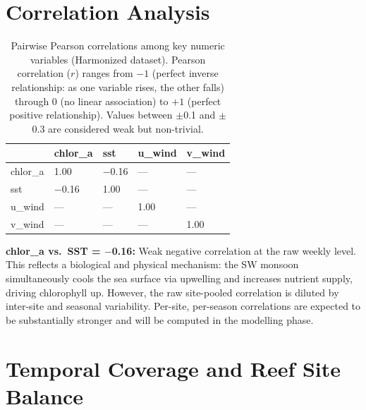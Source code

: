 \documentclass[12pt,a4paper]{report}
\begin{document}
\section{Correlation Analysis}

\begin{table}[H]
\centering
\caption{Pairwise Pearson correlations among key numeric variables (Harmonized dataset). Pearson correlation ($r$) ranges from $-1$ (perfect inverse relationship: as one variable rises, the other falls) through 0 (no linear association) to $+1$ (perfect positive relationship). Values between $\pm$0.1 and $\pm$0.3 are considered weak but non-trivial.}
\begin{tabular}{L{3.5cm}R{2cm}R{2cm}R{2cm}R{2cm}}
\toprule
 & \textbf{chlor\_a} & \textbf{sst} & \textbf{u\_wind} & \textbf{v\_wind} \\
\midrule
{}
chlor\_a & 1.00 & $-$0.16 & --- & --- \\
sst     & $-$0.16 & 1.00 & --- & --- \\
u\_wind  & --- & --- & 1.00 & --- \\
v\_wind  & --- & --- & --- & 1.00 \\
\bottomrule
\end{tabular}
\label{tab:corr}
\end{table}

\begin{findingbox}
\textbf{chlor\_a vs.\ SST = $-$0.16:} Weak negative correlation at the raw weekly
level. This reflects a biological and physical mechanism: the SW monsoon simultaneously
cools the sea surface via upwelling and increases nutrient supply, driving chlorophyll
up. However, the raw site-pooled correlation is diluted by inter-site and seasonal
variability. Per-site, per-season correlations are expected to be substantially stronger
and will be computed in the modelling phase.
\end{findingbox}

\section{Temporal Coverage and Reef Site Balance}
\end{document}
